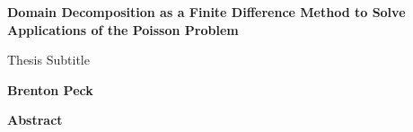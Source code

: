 \thispagestyle{plain}
\begin{center}
    \Large
    \textbf{Domain Decomposition as a Finite Difference Method to Solve Applications of the Poisson Problem}
    
    \vspace{0.4cm}
    \large
    Thesis Subtitle
    
    \vspace{0.4cm}
    \textbf{Brenton Peck}
    
    \vspace{0.9cm}
    \textbf{Abstract}
\end{center}